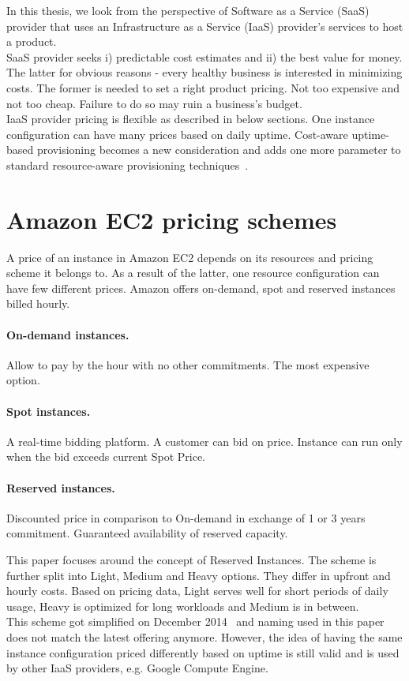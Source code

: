 \documentclass[]{final_report}
\begin{document}
In this thesis, we look from the perspective of Software as a Service (SaaS) provider that uses an Infrastructure as a Service (IaaS) provider's services to host a product. \\
SaaS provider seeks i) predictable cost estimates and ii) the best value for money. The latter for obvious reasons - every healthy business is interested in minimizing costs. The former is needed to set a right product pricing. Not too expensive and not too cheap. Failure to do so may ruin a business's budget. \\
IaaS provider pricing is flexible as described in below sections. One instance configuration can have many prices based on daily uptime. Cost-aware uptime-based provisioning becomes a new consideration and adds one more parameter to standard resource-aware provisioning techniques~\cite{Bartolini:2014:AFC:2658949.2637480}.



\section{Amazon EC2 pricing schemes}

A price of an instance in Amazon EC2 depends on its resources and pricing scheme it belongs to. As a result of the latter, one resource configuration can have few different prices. Amazon offers on-demand, spot and reserved instances billed hourly.

\paragraph{On-demand instances.} Allow to pay by the hour with no other commitments. The most expensive option.
\paragraph{Spot instances.} A real-time bidding platform. A customer can bid on price. Instance can run only when the bid exceeds current Spot Price.
\paragraph{Reserved instances.} Discounted price in comparison to On-demand in exchange of 1 or 3 years commitment. Guaranteed availability of reserved capacity. 

This paper focuses around the concept of Reserved Instances. The scheme is further split into Light, Medium and Heavy options. They differ in upfront and hourly costs. Based on pricing data, Light serves well for short periods of daily usage, Heavy is optimized for long workloads and Medium is in between. \\
This scheme got simplified on December 2014~\cite{AWS:pricing_change} and naming used in this paper does not match the latest offering anymore. However, the idea of having the same instance configuration priced differently based on uptime is still valid and is used by other IaaS providers, e.g. Google Compute Engine.
\end{document}

